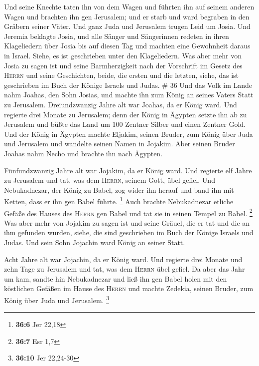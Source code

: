  Und seine Knechte taten ihn von dem Wagen und führten
ihn auf seinem anderen Wagen und brachten ihn gen Jerusalem; und er
starb und ward begraben in den Gräbern seiner Väter. Und ganz Juda und
Jerusalem trugen Leid um Josia.  Und Jeremia beklagte
Josia, und alle Sänger und Sängerinnen redeten in ihren Klageliedern
über Josia bis auf diesen Tag und machten eine Gewohnheit daraus in
Israel. Siehe, es ist geschrieben unter den Klageliedern.
 Was aber mehr von Josia zu sagen ist und seine
Barmherzigkeit nach der Vorschrift im Gesetz des \textsc{Herrn}
 und seine Geschichten, beide, die ersten und die
letzten, siehe, das ist geschrieben im Buch der Könige Israels und
Judas. \# 36  Und das Volk im Lande nahm Joahas, den Sohn
Josias, und machte ihn zum König an seines Vaters Statt zu Jerusalem.
 Dreiundzwanzig Jahre alt war Joahas, da er König ward.
Und regierte drei Monate zu Jerusalem;  denn der König in
Ägypten setzte ihn ab zu Jerusalem und büßte das Land um 100 Zentner
Silber und einen Zentner Gold.  Und der König in Ägypten
machte Eljakim, seinen Bruder, zum König über Juda und Jerusalem und
wandelte seinen Namen in Jojakim. Aber seinen Bruder Joahas nahm Necho
und brachte ihn nach Ägypten.

 Fünfundzwanzig Jahre alt war Jojakim, da er König ward.
Und regierte elf Jahre zu Jerusalem und tat, was dem \textsc{Herrn},
seinem Gott, übel gefiel.  Und Nebukadnezar, der König zu
Babel, zog wider ihn herauf und band ihn mit Ketten, dass er ihn gen
Babel führte. \footnote{\textbf{36:6} Jer 22,18}  Auch
brachte Nebukadnezar etliche Gefäße des Hauses des \textsc{Herrn} gen
Babel und tat sie in seinen Tempel zu Babel. \footnote{\textbf{36:7} Esr
  1,7}  Was aber mehr von Jojakim zu sagen ist und seine
Gräuel, die er tat und die an ihm gefunden wurden, siehe, die sind
geschrieben im Buch der Könige Israels und Judas. Und sein Sohn Jojachin
ward König an seiner Statt.

 Acht Jahre alt war Jojachin, da er König ward. Und
regierte drei Monate und zehn Tage zu Jerusalem und tat, was dem
\textsc{Herrn} übel gefiel.  Da aber das Jahr um kam,
sandte hin Nebukadnezar und ließ ihn gen Babel holen mit den köstlichen
Gefäßen im Hause des \textsc{Herrn} und machte Zedekia, seinen Bruder,
zum König über Juda und Jerusalem. \footnote{\textbf{36:10} Jer 22,24-30}

